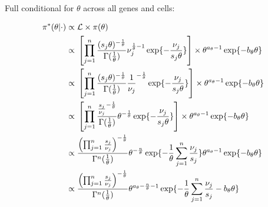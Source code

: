 Full conditional for $\theta$ across all genes and cells:
\begin{fleqn}
\begin{align*}
\pi^*(\theta|\cdot)&\propto{}\mathcal{L}\times\pi(\theta)\\
&\propto{}\left[\prod_{j=1}^{n}\frac{(s_j\theta)^{-\frac{1}{\theta}}}{\Gamma(\frac{1}{\theta})}\nu_j^{\frac{1}{\theta}-1}\exp\lbrace-\frac{\nu_j}{s_j\theta}\rbrace\right]\times{}\theta^{a_\theta-1}\exp\lbrace-b_\theta\theta\rbrace\\
&\propto{}\left[\prod_{j=1}^{n}\frac{(s_j\theta)^{-\frac{1}{\theta}}}{\Gamma(\frac{1}{\theta})}\frac{1}{\nu_j}^{-\frac{1}{\theta}}\exp\lbrace-\frac{\nu_j}{s_j\theta}\rbrace\right]\times\theta^{a_\theta-1}\exp\lbrace-b_\theta\theta\rbrace\\
&\propto{}\left[\prod_{j=1}^{n}\frac{\frac{s_j}{\nu_j}^{-\frac{1}{\theta}}}{\Gamma(\frac{1}{\theta})}\theta^{-\frac{1}{\theta}}\exp\lbrace-\frac{\nu_j}{s_j\theta}\rbrace\right]\times{}\theta^{a_\theta-1}\exp\lbrace-b_\theta\theta\rbrace\\
&\propto{}\frac{\left(\prod_{j=1}^{n}\frac{s_j}{\nu_j}\right)^{-\frac{1}{\theta}}}{\Gamma{}^n(\frac{1}{\theta})}\theta^{-\frac{n}{\theta}}\exp\lbrace-\frac{1}{\theta}\sum_{j=1}^n\frac{\nu_j}{s_j}\rbrace\theta^{a_\theta-1}\exp\lbrace-b_\theta\theta\rbrace\\
&\propto{}\frac{\left(\prod_{j=1}^{n}\frac{s_j}{\nu_j}\right)^{-\frac{1}{\theta}}}{\Gamma{}^n(\frac{1}{\theta})}\theta^{a_\theta-\frac{n}{\theta}-1}\exp\lbrace-\frac{1}{\theta}\sum_{j=1}^n\frac{\nu_j}{s_j}-b_\theta\theta\rbrace
\end{align*}
\end{fleqn}